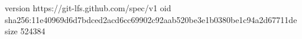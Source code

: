 version https://git-lfs.github.com/spec/v1
oid sha256:11e40969d6d7bdced2acd6cc69902c92aab520be3e1b0380be1c94a2d67711de
size 524384
